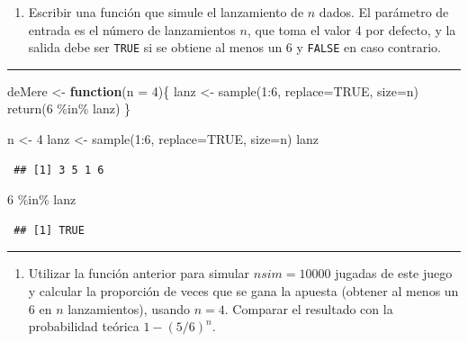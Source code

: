 \documentclass[
  10pt,
]{book}
\newenvironment{Shaded}{\begin{snugshade}}{\end{snugshade}}
\newcommand{\AttributeTok}[1]{\textcolor[rgb]{0.77,0.63,0.00}{#1}}
\newcommand{\ConstantTok}[1]{\textcolor[rgb]{0.00,0.00,0.00}{#1}}
\newcommand{\ControlFlowTok}[1]{\textcolor[rgb]{0.13,0.29,0.53}{\textbf{#1}}}
\newcommand{\DecValTok}[1]{\textcolor[rgb]{0.00,0.00,0.81}{#1}}
\newcommand{\FunctionTok}[1]{\textcolor[rgb]{0.00,0.00,0.00}{#1}}
\newcommand{\NormalTok}[1]{#1}
\newcommand{\OtherTok}[1]{\textcolor[rgb]{0.56,0.35,0.01}{#1}}
\newcommand{\SpecialCharTok}[1]{\textcolor[rgb]{0.00,0.00,0.00}{#1}}
\providecommand{\tightlist}{%
  \setlength{\itemsep}{0pt}\setlength{\parskip}{0pt}}
\theoremstyle{break}
\theoremstyle{nonumberplain}
\begin{document}
\begin{enumerate}
\def\labelenumi{\alph{enumi})}
\tightlist
\item
  Escribir una función que simule el lanzamiento de \(n\) dados. El
  parámetro de entrada es el número de lanzamientos \(n\), que toma
  el valor 4 por defecto, y la salida debe ser \texttt{TRUE} si se
  obtiene al menos un 6 y \texttt{FALSE} en caso contrario.
\end{enumerate}

\begin{center}\rule{0.5\linewidth}{0.5pt}\end{center}

\begin{Shaded}
\begin{Highlighting}[]
\NormalTok{deMere }\OtherTok{\textless{}{-}} \ControlFlowTok{function}\NormalTok{(}\AttributeTok{n =} \DecValTok{4}\NormalTok{)\{}
\NormalTok{  lanz }\OtherTok{\textless{}{-}} \FunctionTok{sample}\NormalTok{(}\DecValTok{1}\SpecialCharTok{:}\DecValTok{6}\NormalTok{, }\AttributeTok{replace=}\ConstantTok{TRUE}\NormalTok{, }\AttributeTok{size=}\NormalTok{n)}
  \FunctionTok{return}\NormalTok{(}\DecValTok{6} \SpecialCharTok{\%in\%}\NormalTok{ lanz)}
\NormalTok{\}}

\NormalTok{n }\OtherTok{\textless{}{-}} \DecValTok{4}
\NormalTok{lanz }\OtherTok{\textless{}{-}} \FunctionTok{sample}\NormalTok{(}\DecValTok{1}\SpecialCharTok{:}\DecValTok{6}\NormalTok{, }\AttributeTok{replace=}\ConstantTok{TRUE}\NormalTok{, }\AttributeTok{size=}\NormalTok{n)}
\NormalTok{lanz}
\end{Highlighting}
\end{Shaded}

\begin{verbatim}
 ## [1] 3 5 1 6
\end{verbatim}

\begin{Shaded}
\begin{Highlighting}[]
\DecValTok{6} \SpecialCharTok{\%in\%}\NormalTok{ lanz}
\end{Highlighting}
\end{Shaded}

\begin{verbatim}
 ## [1] TRUE
\end{verbatim}

\begin{center}\rule{0.5\linewidth}{0.5pt}\end{center}

\begin{enumerate}
\def\labelenumi{\alph{enumi})}
\setcounter{enumi}{1}
\tightlist
\item
  Utilizar la función anterior para simular \(nsim=10000\) jugadas
  de este juego y calcular la proporción de veces que se gana la
  apuesta (obtener al menos un 6 en \(n\) lanzamientos), usando
  \(n=4\). Comparar el resultado con la probabilidad teórica
  \(1-(5/6)^{n}\).
\end{enumerate}
\end{document}
